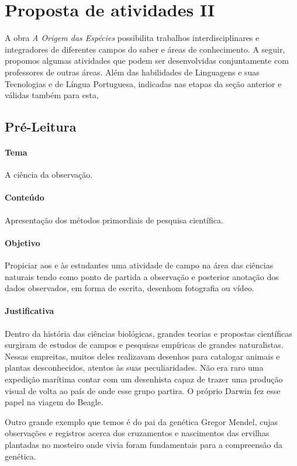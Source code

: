 \documentclass[12pt]{extarticle}
\begin{document}
\section{Proposta de atividades II}

A obra \emph{A Origem das Espécies} possibilita trabalhos interdisciplinares
e integradores de diferentes campos do saber e áreas de conhecimento. A seguir,
propomos algumas atividades que podem ser desenvolvidas conjuntamente com
professores de outras áreas. Além das habilidades de Linguagens e suas
Tecnologias e de Língua Portuguesa, indicadas nas etapas da seção anterior
e válidas também para esta,

\subsection{Pré-Leitura}

\paragraph{Tema} A ciência da observação. 

\paragraph{Conteúdo} Apresentação dos métodos primordiais de pesquisa
científica.

\paragraph{Objetivo} Propiciar aos e às estudantes uma atividade de campo
na área das ciências naturais tendo como ponto de partida a observação
e posterior anotação dos dados observados, em forma de escrita, desenhom
fotografia ou vídeo. 

\paragraph{Justificativa} Dentro da história das ciências biológicas, grandes teorias e propostas
científicas surgiram de estudos de campos e pesquisas empíricas de grandes
naturalistas. Nessas empreitas, muitos deles realizavam desenhos para catalogar
animais e plantas desconhecidos, atentos às suas peculiaridades. Não era raro
uma expedição marítima contar com um desenhista capaz de trazer uma produção
visual de volta ao país de onde esse grupo partira. O próprio Darwin fez esse
papel na viagem do Beagle.

Outro grande exemplo que temos é do pai da genética Gregor Mendel, cujas
observações e registros acerca dos cruzamentos e nascimentos das ervilhas
plantadas no mosteiro onde vivia foram fundamentais para a compreensão da
genética.
\end{document}
